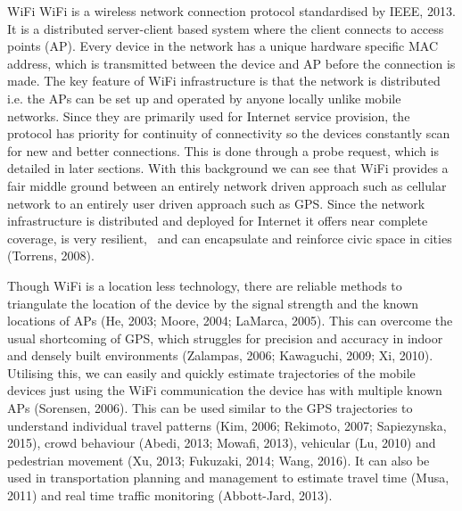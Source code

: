  WiFi
 WiFi is a wireless network connection protocol standardised by IEEE, 2013. It is a distributed server-client based system where the client connects to access points (AP). Every device in the network has a unique hardware specific MAC address, which is transmitted between the device and AP before the connection is made. The key feature of WiFi infrastructure is that the network is distributed i.e. the APs can be set up and operated by anyone locally unlike mobile networks. Since they are primarily used for Internet service provision, the protocol has priority for continuity of connectivity so the devices constantly scan for new and better connections. This is done through a probe request, which is detailed in later sections. With this background we can see that WiFi provides a fair middle ground between an entirely network driven approach such as cellular network to an entirely user driven approach such as GPS. Since the network infrastructure is distributed and deployed for Internet it offers near complete coverage, is very resilient,  and can encapsulate and reinforce civic space in cities (Torrens, 2008).

 Though WiFi is a location less technology, there are reliable methods to triangulate the location of the device by the signal strength and the known locations of APs (He, 2003; Moore, 2004; LaMarca, 2005). This can overcome the usual shortcoming of GPS, which struggles for precision and accuracy in indoor and densely built environments (Zalampas, 2006; Kawaguchi, 2009; Xi, 2010). Utilising this, we can easily and quickly estimate trajectories of the mobile devices just using the WiFi communication the device has with multiple known APs (Sorensen, 2006). This can be used similar to the GPS trajectories to understand individual travel patterns (Kim, 2006; Rekimoto, 2007; Sapiezynska, 2015), crowd behaviour (Abedi, 2013; Mowafi, 2013), vehicular (Lu, 2010) and pedestrian movement (Xu, 2013; Fukuzaki, 2014; Wang, 2016). It can also be used in transportation planning and management to estimate travel time (Musa, 2011) and real time traffic monitoring (Abbott-Jard, 2013).

